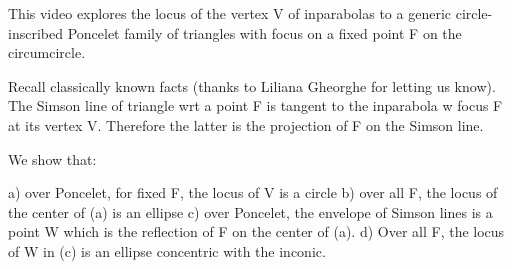 This video explores the locus of the vertex V of inparabolas to a generic circle-inscribed Poncelet family of triangles with focus on a fixed point F on the circumcircle.

Recall classically known facts (thanks to Liliana Gheorghe for letting us know). The Simson line of triangle wrt a point F is tangent to the inparabola w focus F at its vertex V. Therefore the latter is the projection of F on the Simson line.

We show that:

a) over Poncelet, for fixed F, the locus of V is a circle
b) over all F, the locus of the center of (a) is an ellipse
c) over Poncelet, the envelope of Simson lines is a point W which is the reflection of F on the center of (a).
d) Over all F, the locus of W in (c) is an ellipse concentric with the inconic.